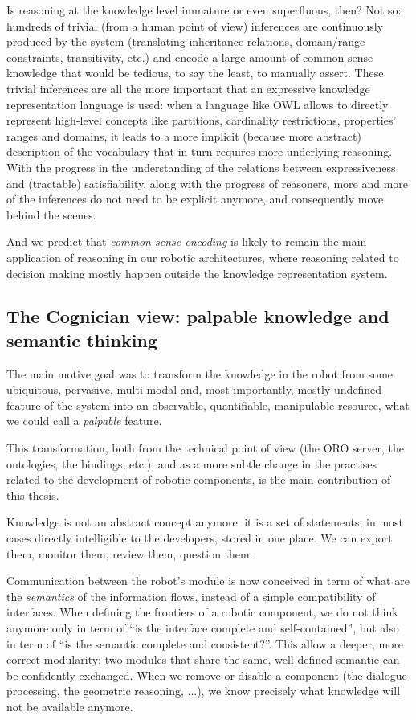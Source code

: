 \documentclass[letterpaper, 10 pt, conference]{ieeeconf}  %
\begin{document}
Is reasoning at the knowledge level immature or even superfluous, then? Not so:
hundreds of trivial (from a human point of view) inferences are continuously
produced by the system (translating inheritance relations, domain/range
constraints, transitivity, etc.) and encode a large amount of common-sense
knowledge that would be tedious, to say the least, to manually assert. These
trivial inferences are all the more important that an expressive knowledge
representation language is used: when a language like OWL allows to directly
represent high-level concepts like partitions, cardinality restrictions,
properties' ranges and domains, it leads to a more implicit (because more
abstract) description of the vocabulary that in turn requires more underlying
reasoning. With the progress in the understanding of the relations between
expressiveness and (tractable) satisfiability, along with the progress of
reasoners, more and more of the inferences do not need to be explicit anymore,
and consequently move behind the scenes.

And we predict that \emph{common-sense encoding} is likely to remain the main
application of reasoning in our robotic architectures, where reasoning related
to decision making mostly happen outside the knowledge representation system.


\subsection{The Cognician view: palpable knowledge and semantic thinking}

The main motive goal was to transform the knowledge in the robot from some ubiquitous,
pervasive, multi-modal and, most importantly, mostly undefined feature of the
system into an observable, quantifiable, manipulable resource, what we could
call a \emph{palpable} feature.

This transformation, both from the technical point of view (the ORO server, the
ontologies, the bindings, etc.), and as a more subtle change in the practises
related to the development of robotic components, is the main contribution of
this thesis.

Knowledge is not an abstract concept anymore: it is a set of statements, in
most cases directly intelligible to the developers, stored in one place. We can
export them, monitor them, review them, question them.

Communication between the robot's module is now conceived in term of what are
the \emph{semantics} of the information flows, instead of a simple
compatibility of interfaces. When defining the frontiers of a robotic
component, we do not think anymore only in term of ``is the interface complete
and self-contained'', but also in term of ``is the semantic complete and
consistent?''. This allow a deeper, more correct modularity: two modules that
share the same, well-defined semantic can be confidently exchanged. When we
remove or disable a component (the dialogue processing, the geometric
reasoning, ...), we know precisely what knowledge will not be available
anymore.
\end{document}
